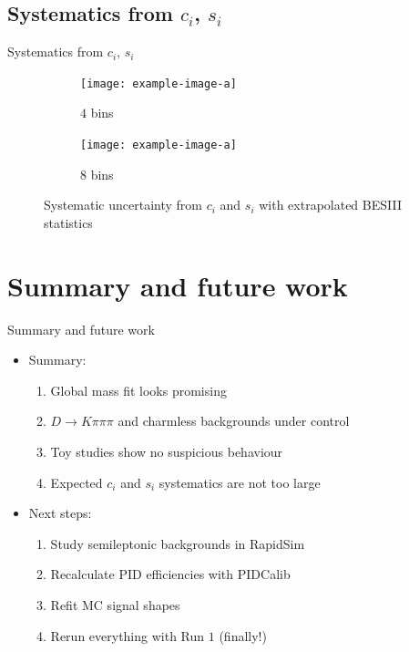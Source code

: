 \documentclass{beamer}
\begin{document}
\subsection{Systematics from \texorpdfstring{$c_i$, $s_i$}{ci, si}}
\begin{frame}{Systematics from $c_i$, $s_i$}
  \begin{figure}
    \centering
    \vspace{-0.2cm}
    \begin{subfigure}{0.5\textwidth}
      \texttt{[image: example-image-a]}
      \caption{$4$ bins}
    \end{subfigure}%
    \begin{subfigure}{0.5\textwidth}
      \texttt{[image: example-image-a]}
      \caption{$8$ bins}
    \end{subfigure}
    \caption{Systematic uncertainty from $c_i$ and $s_i$ with extrapolated BESIII statistics}
  \end{figure}
\end{frame}

\section{Summary and future work}
\begin{frame}{Summary and future work}
  \begin{itemize}
    \item{Summary:}
    \begin{enumerate}
      \setlength\itemsep{1.3em}
      \item{Global mass fit looks promising}
      \item{$D\to K\pi\pi\pi$ and charmless backgrounds under control}
      \item{Toy studies show no suspicious behaviour}
      \item{Expected $c_i$ and $s_i$ systematics are not too large}
    \end{enumerate}
    \item{Next steps:}
    \begin{enumerate}
      \setlength\itemsep{1.3em}
      \item{Study semileptonic backgrounds in RapidSim}
      \item{Recalculate PID efficiencies with PIDCalib}
      \item{Refit MC signal shapes}
      \item{Rerun everything with Run $1$ (finally!)}
    \end{enumerate}
  \end{itemize}
\end{frame}
\end{document}
